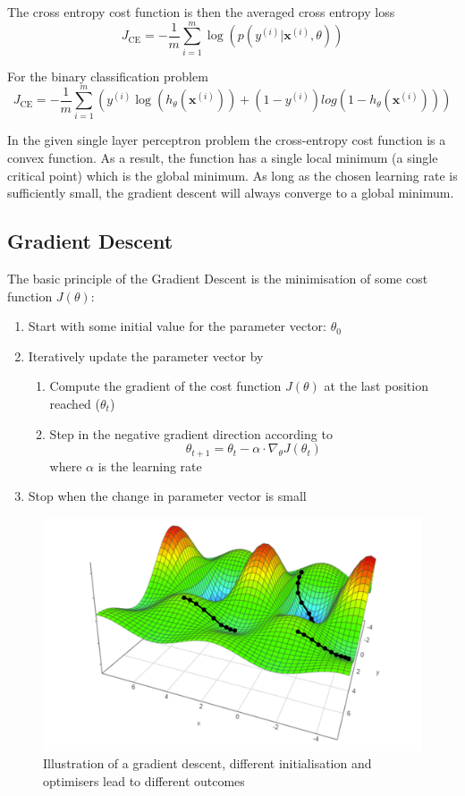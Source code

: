 \documentclass[11pt]{article}
\begin{document}
\noindent
The cross entropy cost function is then the averaged cross entropy loss
\begin{equation}
	J_{\text{CE}} = -\frac{1}{m} \sum_{i=1}^{m}\log\left(p\left(y^{(i)}|\textbf{x}^{(i)},\theta\right)\right)
\end{equation}

\noindent
For the binary classification problem
\begin{equation}
	J_{\text{CE}} = -\frac{1}{m} \sum_{i=1}^{m}\left( y^{(i)}\log(h_\theta(\textbf{x}^{(i)})) + (1-y^{(i)})log(1 - h_\theta(\textbf{x}^{(i)})) \right)
\end{equation}

\noindent
In the given single layer perceptron problem the cross-entropy cost function is a convex function. As a result, the function has a single local minimum (a single critical point) which is the global minimum. As long as the chosen learning rate is sufficiently small, the gradient descent will always converge to a global minimum.

\subsection{Gradient Descent}
The basic principle of the Gradient Descent is the minimisation of some cost function $J(\theta)$:
\begin{enumerate}
	\item Start with some initial value for the parameter vector: $\theta_0$
	\item Iteratively update the parameter vector by
	\begin{enumerate}[label=\roman*.]
		\item Compute the gradient of the cost function $J(\theta)$ at the last position reached ($\theta_t$)
		\item Step in the negative gradient direction according to
		\begin{equation*}
			\theta_{t+1} =\theta_t - \alpha \cdot\nabla_\theta J(\theta_t)
		\end{equation*}
		where $\alpha$ is the learning rate
	\end{enumerate}
	\item Stop when the change in parameter vector is small
\end{enumerate}

\begin{figure}[htb]
	\centering
	\includegraphics[width=0.6\linewidth, keepaspectratio]{img/gradient_descent}
	\caption{Illustration of a gradient descent, different initialisation and optimisers lead to different outcomes}
	\label{fig:gradientdescent}
\end{figure}
\end{document}
